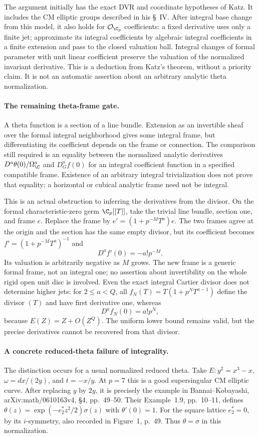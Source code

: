 \documentclass[11pt]{article}
\theoremstyle{definition}\newtheorem{definition}[theorem]{Definition}\newtheorem{remark}[theorem]{Remark}
\begin{document}
The argument initially has the exact DVR and coordinate hypotheses
of Katz. It includes the CM elliptic groups described in his \S~IV.
After integral base change from this model, it also holds for
$\mathcal O_{\C_p}$ coefficients: a fixed derivative uses only a
finite jet; approximate its integral coefficients by algebraic
integral coefficients in a finite extension and pass to the closed
valuation ball. Integral changes of formal parameter with unit
linear coefficient preserve the valuation of the normalized
invariant derivative. This is a deduction from Katz's theorem,
without a priority claim. It is not an automatic assertion about
an arbitrary analytic theta normalization.

\paragraph{The remaining theta-frame gate.}
A theta function is a section of a line bundle. Extension as an
invertible sheaf over the formal integral neighborhood gives some
integral frame, but differentiating its coefficient depends on the
frame or connection. The comparison still required is an equality
between the normalized analytic derivatives
$D^a\theta(0)/\Omega_{\C}^a$ and $D_G^af(0)$ for an integral
coefficient function in a specified compatible frame. Existence of
an arbitrary integral trivialization does not prove that equality;
a horizontal or cubical analytic frame need not be integral.

This is an actual obstruction to inferring the derivatives from
the divisor. On the formal characteristic-zero germ
$\C_p[[T]]$, take the trivial line bundle, section one, and frame
$e$. Replace the frame by
$e'=(1+p^{-M}T^a)e$. The two frames agree at the origin and the
section has the same empty divisor, but its coefficient becomes
$f'=(1+p^{-M}T^a)^{-1}$ and
\[
 D^af'(0)=-a!p^{-M}.
\]
Its valuation is arbitrarily negative as $M$ grows. The new frame
is a generic formal frame, not an integral one; no assertion about
invertibility on the whole rigid open unit disc is involved.
Even the exact integral Cartier divisor does not determine higher
jets: for $2\leq a<Q$, all
$f_N(T)=T(1+p^NT^{a-1})$ define the divisor $(T)$ and have first
derivative one, whereas
\[
 D^af_N(0)=a!p^N,
\]
because $E(Z)=Z+O(Z^Q)$. The uniform lower bound remains valid,
but the precise derivatives cannot be recovered from that divisor.

\paragraph{A concrete reduced-theta failure of integrality.}
The distinction occurs for a usual normalized reduced theta.
Take $E:y^2=x^3-x$, $\omega=dx/(2y)$, and $t=-x/y$.
At $p=7$ this is a good supersingular CM elliptic curve.
After replacing $y$ by $2y$, it is precisely the example in
Bannai--Kobayashi, arXiv:math/0610163v4, \S4, pp.~49--50.
Their Example~1.9, pp.~10--11, defines
$\theta(z)=\exp(-e_2^*z^2/2)\sigma(z)$ with $\theta'(0)=1$.
For the square lattice $e_2^*=0$, by its $i$-symmetry, also recorded
in Figure~1, p.~49. Thus $\theta=\sigma$ in this normalization.
\end{document}
